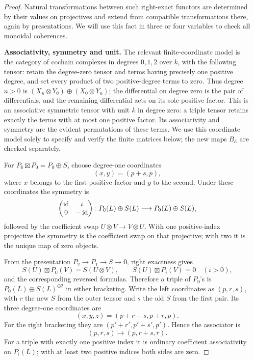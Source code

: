 \begin{proof}
Natural transformations between such right-exact functors are determined by their values on projectives and extend from compatible transformations there, again by presentations. We will use this fact in three or four variables to check all monoidal coherences.

\textbf{Associativity, symmetry and unit.}
The relevant finite-coordinate model is the category of cochain complexes in degrees $0,1,2$ over $k$, with the following tensor: retain the degree-zero tensor and terms having precisely one positive degree, and set every product of two positive-degree terms to zero. Thus degree $n>0$ is $(X_n\otimes Y_0)\oplus(X_0\otimes Y_n)$; the differential on degree zero is the pair of differentials, and the remaining differential acts on its sole positive factor. This is an associative symmetric tensor with unit $k$ in degree zero: a triple tensor retains exactly the terms with at most one positive factor. Its associativity and symmetry are the evident permutations of these terms. We use this coordinate model solely to specify and verify the finite matrices below; the new maps $B_h$ are checked separately.

For $P_0\boxtimes P_0=P_0\oplus S$, choose degree-one coordinates
\[
(x,y)=(p+s,p),
\]
where $x$ belongs to the first positive factor and $y$ to the second. Under these coordinates the symmetry is
\[
\begin{pmatrix}\operatorname{id}&i\\0&-\operatorname{id}\end{pmatrix}:
P_0(L)\oplus S(L)\longrightarrow P_0(L)\oplus S(L),
\]
followed by the coefficient swap $U\otimes V\to V\otimes U$. With one positive-index projective the symmetry is the coefficient swap on that projective; with two it is the unique map of zero objects.

From the presentation $P_2\to P_1\to S\to0$, right exactness gives
\[
S(U)\boxtimes P_0(V)=S(U\otimes V),\qquad
S(U)\boxtimes P_i(V)=0\quad(i>0),
\]
and the corresponding reversed formulas. Therefore a triple of $P_0$'s is $P_0(L)\oplus S(L)^{\oplus2}$ in either bracketing. Write the left coordinates as $(p,r,s)$, with $r$ the new $S$ from the outer tensor and $s$ the old $S$ from the first pair. Its three degree-one coordinates are
\[
(x,y,z)=(p+r+s,p+r,p).
\]
For the right bracketing they are $(p'+r',p'+s',p')$. Hence the associator is
\[
(p,r,s)\longmapsto(p,r+s,r).
\]
For a triple with exactly one positive index it is ordinary coefficient associativity on $P_i(L)$; with at least two positive indices both sides are zero.


\end{proof}
